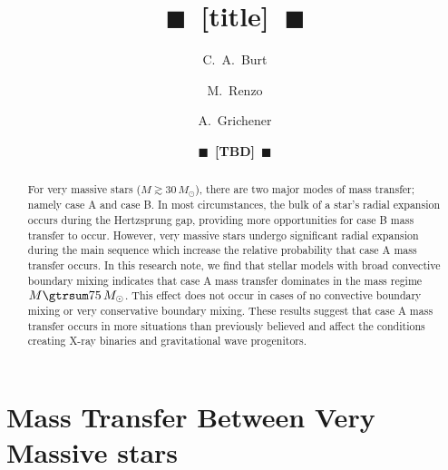 \documentclass[twocolumn]{aastex63}
\newcommand{\todo}[1]{{\large $\blacksquare$~\textbf{\color{red}[#1]}}~$\blacksquare$}
\begin{document}
\title{\todo{title}}

\author[0009-0008-2061-4946]{C.~A.~Burt}

\author[0000-0002-6718-9472]{M.~Renzo}

\author[0000-0002-2215-1841]{A.~Grichener}

\author{\todo{TBD}}

\begin{abstract}
  For very massive stars ($M \gtrsim 30 \, M_{\odot}$), there are two major modes of mass transfer; namely case A and case B. In most circumstances, the bulk of a star's radial expansion occurs during the Hertzsprung gap, providing more opportunities for case B mass transfer to occur. However, very massive stars undergo significant radial expansion during the main sequence which increase the relative probability that case A mass transfer occurs. In this research note, we find that stellar models with broad convective boundary mixing indicates that case A mass transfer dominates in the mass regime $M \gtrsum 75 \, M_{\odot}$. This effect does not occur in cases of no convective boundary mixing or very conservative boundary mixing. These results suggest that case A mass transfer occurs in more situations than previously believed and affect the conditions creating X-ray binaries and gravitational wave progenitors.
\end{abstract}

\section{Mass Transfer Between Very Massive stars }
\end{document}
